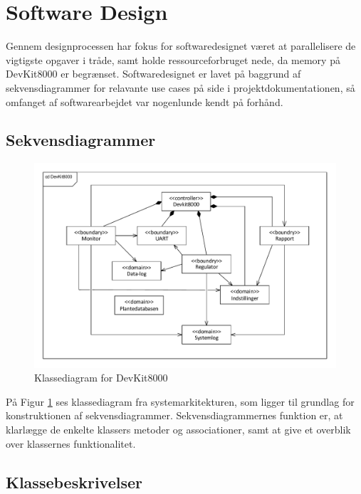 \section{Software Design} \label{ch:SWdesign}

Gennem designprocessen har fokus for softwaredesignet været at parallelisere de vigtigste opgaver i tråde, samt holde ressourceforbruget nede, da memory på DevKit8000 er begrænset. Softwaredesignet er lavet på baggrund af sekvensdiagrammer for relavante use cases på side \pageref{P-sec:usecasebeskrivelser} i projektdokumentationen, så omfanget af softwarearbejdet var nogenlunde kendt på forhånd.

\subsection{Sekvensdiagrammer}

\begin{figure}[h!]
\centering
\includegraphics[width=\textwidth - 1 cm]{../fig/UML_autogreen.pdf}
\caption{Klassediagram for DevKit8000}
\label{fig:applikationsmodel} 
\end{figure}

På Figur \ref{fig:applikationsmodel} ses klassediagram fra systemarkitekturen, som ligger til grundlag for konstruktionen af sekvensdiagrammer. Sekvensdiagrammernes funktion er, at klarlægge de enkelte klassers metoder og associationer, samt at give et overblik over klassernes funktionalitet.

\clearpage

\subsection{Klassebeskrivelser}

